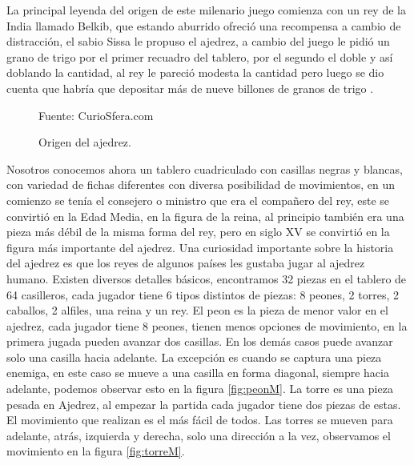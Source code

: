 \documentclass[conference]{IEEEtran}
\newcommand\tab[1][1cm]{\hspace*{#1}}
\begin{document}
    La principal leyenda del origen de este milenario juego comienza con un rey de la India llamado Belkib, que estando aburrido ofreció una recompensa a cambio de distracción, el sabio Sissa le propuso el ajedrez, a cambio del juego le pidió un grano de trigo por el primer recuadro del tablero, por el segundo el doble y así doblando la cantidad, al rey le pareció modesta la cantidad pero luego se dio cuenta que habría que depositar más de nueve billones de granos de trigo \citep{origenajedrez}.
    \begin{figure}[ht]
        \caption{Origen del ajedrez.}
        {{\footnotesize Fuente: CurioSfera.com}}
        \label{figdajedrezold}
    \end{figure}
    Nosotros conocemos ahora un tablero cuadriculado con casillas negras y blancas, con variedad de fichas diferentes con diversa posibilidad de movimientos, en un comienzo se tenía el consejero o ministro que era el compañero del rey, este se convirtió en la Edad Media, en la figura de la reina, al principio también era una pieza más débil de la misma forma del rey, pero en siglo XV se convirtió en la figura más importante del ajedrez. Una curiosidad importante sobre la historia del ajedrez es que los reyes de algunos países les gustaba jugar al ajedrez humano.
    \newline
    \newline
    \tab[0.55cm] Existen diversos detalles básicos, encontramos 32 piezas en el tablero de 64 casilleros, cada jugador tiene 6 tipos distintos de piezas: 8 peones, 2 torres, 2 caballos, 2 alfiles, una reina y un rey.
    \newline
    \newline
    \tab[0.55cm] El peon es la pieza de menor valor en el ajedrez, cada jugador tiene 8 peones, tienen menos opciones de movimiento, en la primera jugada pueden avanzar dos casillas. En los demás casos puede avanzar solo una casilla hacia adelante. La excepción es cuando se captura una pieza enemiga, en este caso se mueve a una casilla en forma diagonal, siempre hacia adelante, podemos observar esto en la figura \ref{fig:peonM}. La torre es una pieza pesada en Ajedrez, al empezar la partida cada jugador tiene dos piezas de estas. El movimiento que realizan es el más fácil de todos. Las torres se mueven para adelante, atrás, izquierda y derecha, solo una dirección a la vez, observamos el movimiento en la figura  \ref{fig:torreM}.
    
\end{document}
